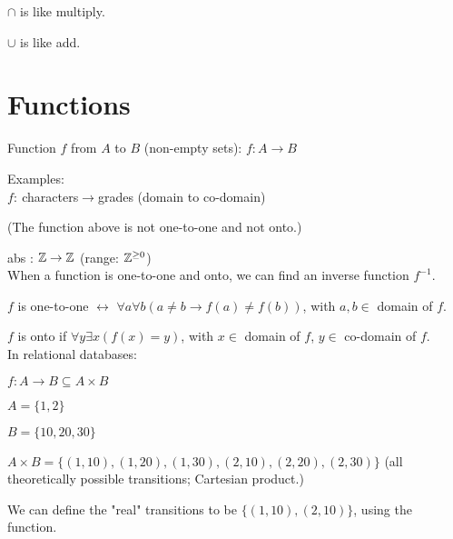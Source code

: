 \documentclass{exam}
\begin{document}
	$\cap$ is like multiply.
	
	$\cup$ is like add.
	
	\section{Functions}
	
	Function $f$ from $A$ to $B$ (non-empty sets): $f : A \rightarrow B$
    
    Examples:\\
	
	$f :\ $characters$ \rightarrow $grades (domain to co-domain)
    
    (The function above is not one-to-one and not onto.)
	
    abs : $\Bbb Z \rightarrow \Bbb Z$ (range: $\Bbb Z^{\geq 0}$)\\
    
    
    When a function is one-to-one and onto, we can find an inverse function $f^{-1}$.
    
    $f$ is one-to-one $\leftrightarrow$ $\forall a \forall b (a \neq b \rightarrow f(a) \neq f(b))$, with $a,b \in$ domain of $f$.
    
    $f$ is onto if $\forall y \exists x (f(x) = y)$, with $x \in$ domain of $f$, $y \in$ co-domain of $f$.\\
    
    In relational databases:
    
    $f : A \rightarrow B \subseteq A \times B$
    
    $A = \{1,2\}$
    
    $B = \{10,20,30\}$
    
    $A \times B = \{(1,10),(1,20),(1,30),(2,10),(2,20),(2,30)\}$ (all theoretically possible transitions; Cartesian product.)
    
    We can define the "real" transitions to be $\{(1,10),(2,10)\}$, using the function.
    
\end{document}
